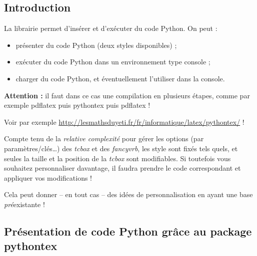 \documentclass[a4paper,french,11pt]{article}
\newcommand\cmaj[1]{%
	{\tcbox[vignetteMaJ]{#1}\xspace}%
}
\newcommand\clib[1]{%
	{\tcbox[vignettelib]{#1}\xspace}%
}
\begin{document}
\begin{codetex}
\end{codetex}

\subsection{Introduction}

\begin{codeidee}
\cmaj{2.5.0} La \textsf{librairie} \clib{pythontex} permet d'insérer et d'exécuter du code \textsf{Python}. On peut :

\begin{itemize}
	\item \cmaj{2.5.8} présenter du code \textsf{Python} (deux styles disponibles) ;
	\item exécuter du code \textsf{Python} dans un environnement type \og console \fg{} ;
	\item charger du code \textsf{Python}, et éventuellement l'utiliser dans la console.
\end{itemize}
\end{codeidee}

\begin{codeattention}
\textbf{Attention : }il faut dans ce cas une compilation en plusieurs étapes, comme par exemple \textsf{pdflatex puis pythontex puis pdflatex} !

Voir par exemple \url{http://lesmathsduyeti.fr/fr/informatique/latex/pythontex/} !
\end{codeattention}

\begin{codeinfo}
Compte tenu de la \textit{relative complexité} pour gérer les options (par paramètres/clés\ldots) des \textit{tcbox} et des \textit{fancyvrb}, les style sont \og fixés \fg{} tels quels, et seules la taille et la position de la \textit{tcbox} sont modifiables. Si toutefois vous souhaitez personnaliser davantage, il faudra prendre le code correspondant et appliquer vos modifications !

Cela peut donner -- en tout cas -- des idées de personnalisation en ayant une base \textit{pré}existante !
\end{codeinfo}

\subsection{Présentation de code Python grâce au package pythontex}\label{pythontex}
\end{document}
